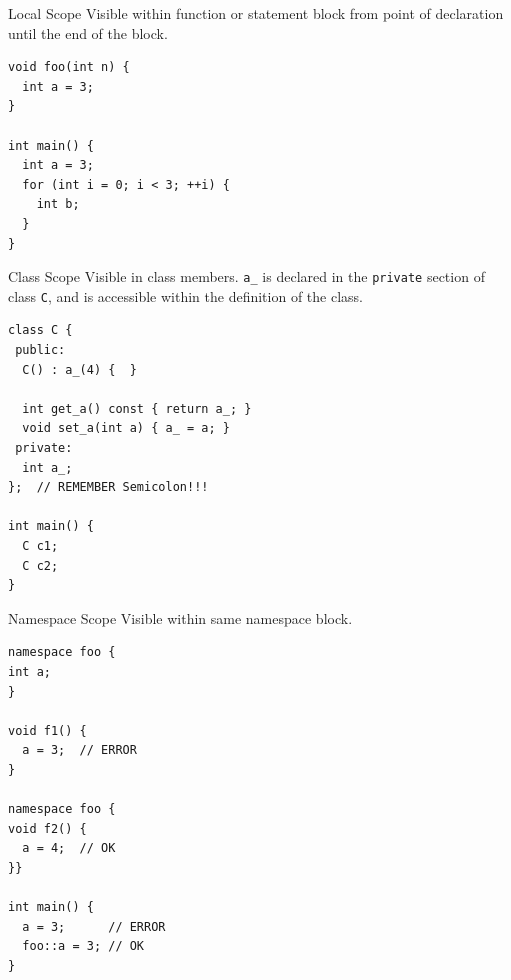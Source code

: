 \documentclass[presentation]{beamer}
\begin{document}
\begin{frame}[fragile,label={sec:orgheadline24}]{Local Scope}
 Visible within function or statement block from point of
declaration until the end of the block.

\begin{verbatim}
void foo(int n) {
  int a = 3;
}

int main() {
  int a = 3;
  for (int i = 0; i < 3; ++i) {
    int b;
  }
}
\end{verbatim}
\end{frame}

\begin{frame}[fragile,label={sec:orgheadline25}]{Class Scope}
 Visible in class members.  \texttt{a\_} is declared in the \texttt{private}
section of class \texttt{C}, and is accessible within the definition of
the class.

\begin{verbatim}
class C {
 public:
  C() : a_(4) {  }

  int get_a() const { return a_; }
  void set_a(int a) { a_ = a; }
 private:
  int a_;
};  // REMEMBER Semicolon!!!

int main() {
  C c1;
  C c2;
}
\end{verbatim}
\end{frame}

\begin{frame}[fragile,label={sec:orgheadline26}]{Namespace Scope}
 Visible within same namespace block.

\begin{verbatim}
namespace foo {
int a;
}

void f1() {
  a = 3;  // ERROR
}

namespace foo {
void f2() {
  a = 4;  // OK
}}

int main() {
  a = 3;      // ERROR
  foo::a = 3; // OK
}
\end{verbatim}
\end{frame}
\end{document}
